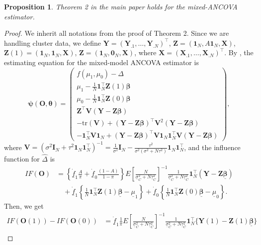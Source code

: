 \documentclass[12pt]{article}
\newtheorem{proposition}{Proposition}
\newcommand{\bX}{\boldsymbol{X}}
\newcommand{\bO}{\boldsymbol{O}}
\newcommand{\bZ}{\boldsymbol{Z}}
\newcommand{\bY}{\boldsymbol{Y}}
\newcommand{\bone}{\boldsymbol{1}}
\newcommand{\bzero}{\boldsymbol{0}}
\newcommand{\bbeta}{\boldsymbol{\beta}}
\newcommand{\btheta}{\boldsymbol{\theta}}
\newcommand{\bpsi}{\boldsymbol{\psi}}
\newcommand{\bfV}{\mathbf{V}}
\newcommand{\bfI}{\mathbf{I}}
\begin{document}
\begin{proposition}\label{prop: mixed-ancova}
    Theorem 2 in the main paper holds for the mixed-ANCOVA estimator. 
\end{proposition}
\begin{proof}
    We inherit all notations from the proof of Theorem 2. 
    Since we are handling cluster data, we define $\bY = (\bY_{.1}, \dots, \bY_{.N})^\top$, $\bZ = (\bone_N, A\bone_N, \mathbf{X})$, $\bZ(1) = (\bone_N, \bone_N, \mathbf{X})$, $\bZ = (\bone_N, \bzero_N, \mathbf{X})$, where $\mathbf{X} = (\bX_{.1}, \dots, \bX_{.N})^\top$.
    By \cite{wang2023CRT}, the estimating equation for the mixed-model ANCOVA estimator is 
    \begin{equation}\label{eq: lmm-psi-C}
    \bpsi(\bO,\btheta) = \left(\begin{array}{c}
    f(\mu_1,\mu_0) -\Delta\\
    \mu_1 - \frac{1}{N}\bone_{N}^\top\bZ(1)\bbeta \\
    \mu_0 - \frac{1}{N}\bone_{N}^\top\bZ(0)\bbeta \\
    \bZ^{\top}\bfV(\bY - \bZ\bbeta)  \\
    -\textrm{tr}(\bfV) + (\bY - \bZ\bbeta)^\top \bfV^2(\bY - \bZ\bbeta)\\
  -\bone_{N}^\top\bfV\bone_{N} + (\bY - \bZ\bbeta)^\top \bfV\bone_{N}\bone_{N}^\top \bfV(\bY - \bZ\bbeta)    
   \end{array}\right),
\end{equation}
where $\bfV = (\sigma^2 \bfI_N + \tau^2 \bone_N \bone_N^\top)^{-1} = \frac{1}{\sigma^2} \bfI_N -  \frac{\tau^2}{\sigma^2(\sigma^2+N\tau^2)}\bone_{N}\bone_{N}^\top$, and the influence function for $\widehat{\Delta}$ is
\begin{align*}
    IF(\bO) &= \left\{\dot{\underline{f}}_1\frac{A}{\pi} + \dot{\underline{f}}_0\frac{(1-A)}{1-\pi}\right\} E\left[\frac{N}{ \underline\sigma_C^2 + N\underline\tau_C^2}\right]^{-1} \frac{1}{\underline\sigma_C^2 + N\underline\tau_C^2} \bone_N^\top (\bY - \bZ\underline{\bbeta})  \\
    &\quad + \dot{\underline{f}}_1\left\{\frac{1}{N}\bone_{N}^\top\bZ(1)\underline{\bbeta} - \underline{\mu}_1\right\} + \dot{\underline{f}}_0\left\{\frac{1}{N}\bone_{N}^\top\bZ(0)\underline{\bbeta} - \underline{\mu}_0\right\}.
\end{align*}
Then, we get
\begin{align*}
    IF(\bO(1)) - IF(\bO(0)) & = \dot{\underline{f}}_1\frac{1}{\pi}E\left[\frac{N}{ \underline\sigma_C^2 + N\underline\tau_C^2}\right]^{-1} \frac{1}{\underline\sigma_C^2 + N\underline\tau_C^2} \bone_N^\top \{\bY(1) - \bZ(1)\underline{\bbeta}\} \\

\end{align*}
\end{proof}
\end{document}
